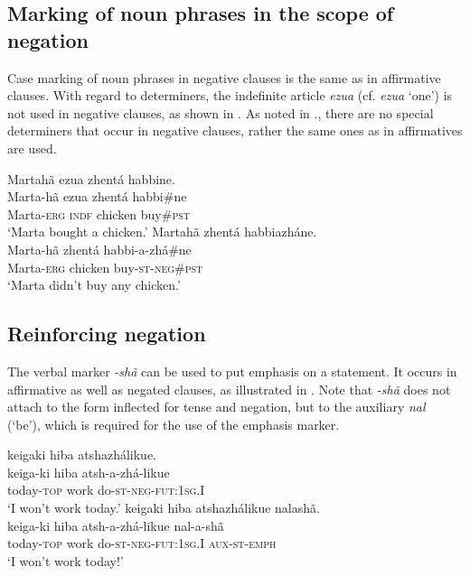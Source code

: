 \documentclass[output=paper,colorlinks,citecolor=brown]{langscibook}
\begin{document}
\subsection{Marking of noun phrases in the scope of negation}\label{sec:kog:4.3}

Case marking of noun phrases in negative clauses is the same as in affirmative clauses. With regard to determiners, the indefinite article \textit{ezua} (cf. \textit{ezua} ‘one’) is not used in negative clauses, as shown in . As noted in ., there are no special determiners that occur in negative clauses, rather the same ones as in affirmatives are used.

\ea\label{ex:kog:65}
    \ea\label{ex:kog:65a}Martahã ezua zhentá habbine.\\
        \gll  Marta{}-hã ezua zhentá habbi\#ne\\ 
             Marta-\textsc{erg} \textsc{indf} chicken buy\#\textsc{pst} \\
        \glt ‘Marta bought a chicken.’
    \ex\label{ex:kog:65b}Martahã zhentá habbiazháne.\\
        \gll  Marta-hã zhentá habbi-a-zhá\#ne\\
               Marta-\textsc{erg} chicken buy{}-\textsc{st-neg}\#\textsc{pst}\\
        \glt  ‘Marta didn’t buy any chicken.’
    \z
\z 

\subsection{Reinforcing negation}\label{sec:kog:4.4}

The verbal marker \textit{{}-shã} can be used to put emphasis on a statement. It occurs in affirmative as well as negated clauses, as illustrated in . Note that \textit{{}-shã} does not attach to the form inflected for tense and negation, but to the auxiliary \textit{nal} (‘be’), which is required for the use of the emphasis marker.

\ea\label{ex:kog:66}
    \ea\label{ex:kog:66a}keigaki hiba atshazhálikue.\\
        \gll  keiga{}-ki hiba atsh{}-a{}-zhá{}-likue\\ 
              today{}-\textsc{top} work do-\textsc{st-neg-fut:1sg.I}\\
        \glt ‘I won’t work today.’
    \ex\label{ex:kog:66b}keigaki hiba atshazhálikue nalashã.\\
        \gll  keiga{}-ki hiba atsh{}-a{}-zhá{}-likue nal-a-shã\\
              today{}-\textsc{top} work do-\textsc{st-neg-fut:1sg.I} \textsc{aux-st-emph}\\
        \glt ‘I won’t work today!’
    \z
\z 
\end{document}
